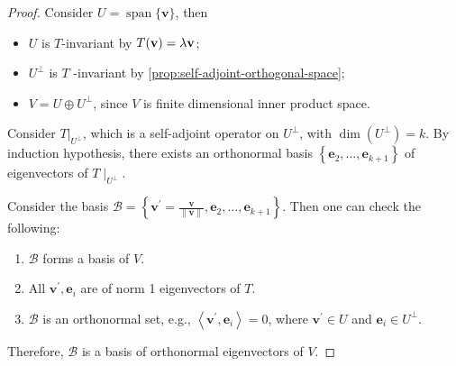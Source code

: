 \begin{proof}
Consider \(U = \operatorname{span}\{ \mathbf{v}\}\), then
\begin{itemize}
\item \(U\) is \(T\)-invariant by \(T({\bf v}) = \lambda {\bf v}\);
\item \({U}^{ \bot  }\) is \(T\) -invariant by \autoref{prop:self-adjoint-orthogonal-space};
\item \(V = U \oplus  {U}^{ \bot  }\), since \(V\) is finite dimensional inner product space.
\end{itemize}

Consider \({\left. T\right| }_{{U}^{ \bot  }}\), which is a self-adjoint operator on \({U}^{ \bot  }\), with \(\dim \left( {U}^{ \bot  }\right)  = k\). By induction hypothesis, there exists an orthonormal basis \(\left\{  {{\mathbf{e}}_{2},\ldots,{\mathbf{e}}_{k + 1}}\right\}\) of eigenvectors of \(T{ \mid  }_{{U}^{ \bot  }}\).

Consider the basis \(\mathcal{B} = \left\{  {{\mathbf{v}}^{\prime } = \frac{\mathbf{v}}{\parallel \mathbf{v}\parallel},{\mathbf{e}}_{2},\ldots,{\mathbf{e}}_{k + 1}}\right\}\). Then one can check the following:
\begin{enumerate}
    \item \(\mathcal{B}\) forms a basis of \(V\).
    \item All \({\mathbf{v}}^{\prime },{\mathbf{e}}_{i}\) are of norm 1 eigenvectors of \(T\).
    \item \(\mathcal{B}\) is an orthonormal set, e.g., \(\left\langle  {{\mathbf{v}}^{\prime },{\mathbf{e}}_{i}}\right\rangle   = 0\), where \({\mathbf{v}}^{\prime } \in  U\) and \({\mathbf{e}}_{i} \in  {U}^{ \bot  }\).
\end{enumerate}
Therefore, \(\mathcal{B}\) is a basis of orthonormal eigenvectors of \(V\).
\end{proof}

